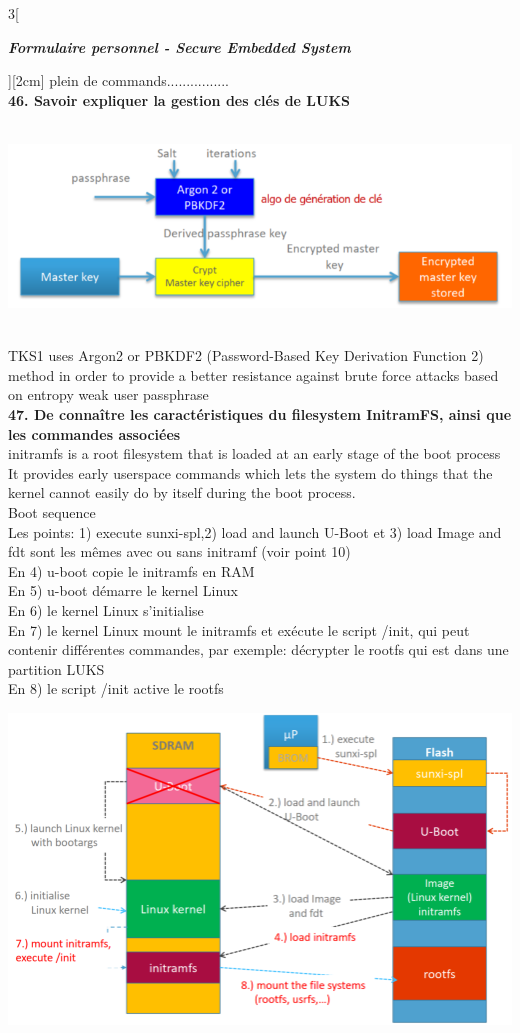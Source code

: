 \begin{multicols}{3}[\centerline{ \large\em \textbf{Formulaire personnel - Secure Embedded System}}][2cm]
plein de commands................\\
\textbf{46. Savoir expliquer la gestion des clés de LUKS\\}~
\begin{minipage}{\linewidth}
	\centering
    \includegraphics[width =0.8\columnwidth]{images/36.png}
\end{minipage}\\
TKS1 uses Argon2 or PBKDF2 (Password-Based Key Derivation Function 2)
method in order to provide a better resistance against brute force attacks
based on entropy weak user passphrase
\\ \textbf{47. De connaître les caractéristiques du filesystem InitramFS, ainsi que les commandes associées\\}
initramfs is a root filesystem that is loaded at an early stage of the boot
process\\
It provides early userspace commands which lets the system do things that
the kernel cannot easily do by itself during the boot process.\\
Boot sequence\\
Les points: 1) execute sunxi-spl,2) load and launch U-Boot et 3) load Image and fdt sont les mêmes avec ou sans initramf (voir point 10)\\
En 4) u-boot copie le initramfs en RAM\\
En 5) u-boot démarre le kernel Linux\\
En 6) le kernel Linux s’initialise\\
En 7) le kernel Linux mount le initramfs et exécute le script /init, qui peut
contenir différentes commandes, par exemple: décrypter le rootfs qui est
dans une partition LUKS\\
En 8) le script /init active le rootfs\\
\begin{minipage}{\linewidth}
	\centering
    \includegraphics[width =0.6\columnwidth]{images/37.png}

\end{minipage}
\end{multicols}
